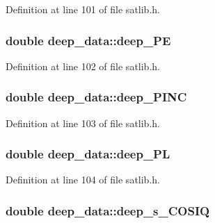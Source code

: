 Definition at line 101 of file satlib.\-h.

\hypertarget{structdeep__data_ab1c261ff7f2453a8e7215c61feaf0805}{
\subsubsection[{deep\-\_\-\-P\-E}]{\setlength{\rightskip}{0pt plus 5cm}double deep\-\_\-data\-::deep\-\_\-\-P\-E}}\label{structdeep__data_ab1c261ff7f2453a8e7215c61feaf0805}


Definition at line 102 of file satlib.\-h.

\hypertarget{structdeep__data_af2f5e518e3f3fce54ed26609f3c79b54}{
\subsubsection[{deep\-\_\-\-P\-I\-N\-C}]{\setlength{\rightskip}{0pt plus 5cm}double deep\-\_\-data\-::deep\-\_\-\-P\-I\-N\-C}}\label{structdeep__data_af2f5e518e3f3fce54ed26609f3c79b54}


Definition at line 103 of file satlib.\-h.

\hypertarget{structdeep__data_a442dfa180943989c1f3846c653ccb6c5}{
\subsubsection[{deep\-\_\-\-P\-L}]{\setlength{\rightskip}{0pt plus 5cm}double deep\-\_\-data\-::deep\-\_\-\-P\-L}}\label{structdeep__data_a442dfa180943989c1f3846c653ccb6c5}


Definition at line 104 of file satlib.\-h.

\hypertarget{structdeep__data_aeb703feb0275a9df4c3f203f549cf68e}{
\subsubsection[{deep\-\_\-s\-\_\-\-C\-O\-S\-I\-Q}]{\setlength{\rightskip}{0pt plus 5cm}double deep\-\_\-data\-::deep\-\_\-s\-\_\-\-C\-O\-S\-I\-Q}}\label{structdeep__data_aeb703feb0275a9df4c3f203f549cf68e}


